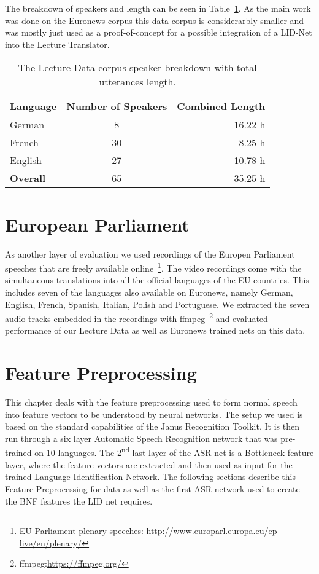 The breakdown of speakers and length can be seen in Table~\ref{tab:spkDataLD}. As the main work was done on the Euronews corpus this data corpus is considerarbly smaller and was mostly just used as a proof-of-concept for a possible integration of a LID-Net into the Lecture Translator. 
\begin{table}[h!]
\label{tab:spkDataLD}
\centering
\begin{tabular}{| l | c | r | }
	\hline
	\textbf{Language} & \textbf{Number of Speakers} & \textbf{Combined Length} \\
	\hline
	German & 8 &  16.22 h \\
	French & 30 & 8.25 h \\  
	English & 27 & 10.78 h \\ 
	\hline
	\textbf{Overall} & 65 & 35.25 h\\
	\hline
	
\end{tabular}
\caption{The Lecture Data corpus speaker breakdown with total utterances length.}
\end{table}

\section{European Parliament}
\label{sec:LITasks:EU}

As another layer of evaluation we used recordings of the Europen Parliament speeches that are freely available online~\footnote{EU-Parliament plenary speeches: \url{http://www.europarl.europa.eu/ep-live/en/plenary/}}. The video recordings come with the simultaneous translations into all the official languages of the EU-countries. This includes seven of the languages also available on Euronews, namely German, English, French, Spanish, Italian, Polish and Portuguese. We extracted the seven audio tracks embedded in the recordings with ffmpeg~\footnote{ffmpeg:\url{https://ffmpeg.org/}} and evaluated performance of our Lecture Data as well as Euronews trained nets on this data.

\section{Feature Preprocessing}
\label{ch:FP}

This chapter deals with the feature preprocessing used to form normal speech into feature vectors to be understood by neural networks. The setup we used is based on the standard capabilities of the Janus Recognition Toolkit. It is then run through a six layer Automatic Speech Recognition network that was pre-trained on 10 languages. The 2\textsuperscript{nd} last layer of the ASR net is a Bottleneck feature layer, where the feature vectors are extracted and then used as input for the trained Language Identification Network. The following sections describe this Feature Preprocessing for data as well as the first ASR network used to create the BNF features the LID net requires.

